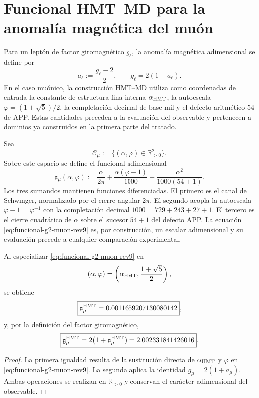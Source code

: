 \section{Funcional HMT--MD para la anomalía magnética del muón}
\label{sec:anomalia-magnetica-muon-rev9}

Para un leptón de factor giromagnético \(g_\ell\), la anomalía magnética
adimensional se define por
\[
 a_\ell:=\frac{g_\ell-2}{2},
 \qquad
 g_\ell=2(1+a_\ell).
\]
En el caso muónico, la construcción HMT--MD utiliza como coordenadas de
entrada la constante de estructura fina interna \(\alpha_{\rm HMT}\), la
autoescala \(\varphi=(1+\sqrt5)/2\), la completación decimal de base mil y
el defecto aritmético \(54\) de APP. Estas cantidades preceden a la
evaluación del observable y pertenecen a dominios ya construidos en la
primera parte del tratado.

Sea
\[
 \mathcal C_\mu
 :=\{(\alpha,\varphi)\in\mathbb R_{>0}^2\}.
\]
Sobre este espacio se define el funcional adimensional
\begin{equation}
 \mathfrak a_\mu(\alpha,\varphi)
 :=\frac{\alpha}{2\pi}
 +\frac{\alpha(\varphi-1)}{1000}
 +\frac{\alpha^2}{1000(54+1)}.
 \label{eq:funcional-g2-muon-rev9}
\end{equation}
Los tres sumandos mantienen funciones diferenciadas. El primero es el canal
de Schwinger, normalizado por el cierre angular \(2\pi\). El segundo acopla la
autoescala \(\varphi-1=\varphi^{-1}\) con la completación decimal
\(1000=729+243+27+1\). El tercero es el cierre cuadrático de \(\alpha\)
sobre el sucesor \(54+1\) del defecto APP. La ecuación
\eqref{eq:funcional-g2-muon-rev9} es, por construcción, un escalar
adimensional y su evaluación precede a cualquier comparación experimental.

\begin{proposition}
Al especializar \eqref{eq:funcional-g2-muon-rev9} en
\[
 (\alpha,\varphi)
 =\left(\alpha_{\rm HMT},\frac{1+\sqrt5}{2}\right),
\]
se obtiene
\[
 \boxed{\mathfrak a_\mu^{\rm HMT}
 =0.0011659207130080142},
\]
y, por la definición del factor giromagnético,
\[
 \boxed{\mathfrak g_\mu^{\rm HMT}
 =2\bigl(1+\mathfrak a_\mu^{\rm HMT}\bigr)
 =2.002331841426016}.
\]
\end{proposition}

\begin{proof}
La primera igualdad resulta de la sustitución directa de
\(\alpha_{\rm HMT}\) y \(\varphi\) en
\eqref{eq:funcional-g2-muon-rev9}. La segunda aplica la identidad
\(g_\mu=2(1+a_\mu)\). Ambas operaciones se realizan en
\(\mathbb R_{>0}\) y conservan el carácter adimensional del observable.
\end{proof}

